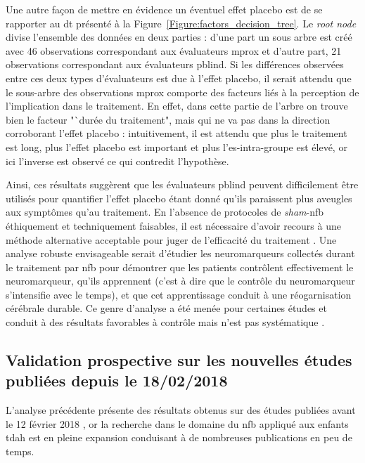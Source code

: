 Une autre façon de mettre en évidence un éventuel effet placebo est de se rapporter au \gls{dt} présenté à la Figure~\ref{Figure:factors_decision_tree}. Le 
\textit{root node} divise l'ensemble des données en deux parties : d'une part un sous arbre est créé avec 46 observations correspondant aux évaluateurs
\gls{mprox} et d'autre part, 21 observations correspondant aux évaluateurs \gls{pblind}. Si les différences observées entre ces deux types d'évaluateurs est due à l'effet
placebo, il serait attendu que le sous-arbre des observations \gls{mprox} comporte des facteurs liés à la perception de l'implication dans le traitement. En effet, dans cette
partie de l'arbre on trouve bien le facteur "`durée du traitement", mais qui ne va pas dans la direction corroborant l'effet placebo : intuitivement, 
il est attendu que plus le traitement est long, plus l'effet placebo est important et plus l'\gls{es}-intra-groupe est élevé, or ici l'inverse est observé ce qui
contredit l'hypothèse. 

Ainsi, ces résultats suggèrent que les évaluateurs \gls{pblind} peuvent difficilement être utilisés pour quantifier l'effet placebo étant donné qu'ils paraissent
plus aveugles aux symptômes qu'au traitement. En l'absence de protocoles de \textit{sham}-\gls{nfb} éthiquement \citep{Holtmann2014} et techniquement \citep{Birbaumer1991} 
faisables, il est nécessaire d'avoir recours à une méthode alternative acceptable pour juger de l'efficacité du traitement \citep{World-Medical-Association2000}. 
Une analyse robuste envisageable serait d'étudier les neuromarqueurs collectés durant le traitement par \gls{nfb} pour démontrer que les patients contrôlent 
effectivement le neuromarqueur, qu'ils apprennent (c'est à dire que le contrôle du neuromarqueur s'intensifie avec le temps), et que cet apprentissage conduit 
à une réogarnisation cérébrale durable. Ce genre d'analyse a été menée pour certaines études et conduit à des résultats favorables à contrôle mais n'est pas 
systématique \citep{Arns2014}.

\subsection{Validation prospective sur les nouvelles études publiées depuis le 18/02/2018}

L'analyse précédente présente des résultats obtenus sur des études publiées avant le 12 février 2018 \citep{Bussalb2019a}, or la recherche dans le domaine du \gls{nfb} appliqué aux enfants \gls{tdah} est
en pleine expansion conduisant à de nombreuses publications en peu de temps.

